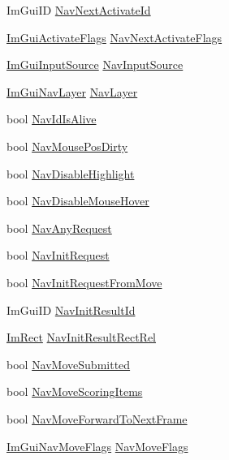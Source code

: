 \begin{DoxyCompactItemize}
Im\+Gui\+ID \hyperlink{structImGuiContext_abc1fa0d9750d44d4595905a0ce178ded}{Nav\+Next\+Activate\+Id}
\item 
\hyperlink{imgui__internal_8h_a69818e5784f8f39375ee58059c449ab2}{Im\+Gui\+Activate\+Flags} \hyperlink{structImGuiContext_a498c30d93a56d5cc173687ab25d86f85}{Nav\+Next\+Activate\+Flags}
\item 
\hyperlink{imgui__internal_8h_a8ee603a145a3a4f4ab5c93c8c8333b78}{Im\+Gui\+Input\+Source} \hyperlink{structImGuiContext_a3054bc5ed01af6c56159cd8de77e7b44}{Nav\+Input\+Source}
\item 
\hyperlink{imgui__internal_8h_afb412215b8327dc2c6af2c19fdca64c6}{Im\+Gui\+Nav\+Layer} \hyperlink{structImGuiContext_a19072bf282ae59f30d55478d74195d45}{Nav\+Layer}
\item 
bool \hyperlink{structImGuiContext_aabd1e23f5be55f6331281f2c2ea9e411}{Nav\+Id\+Is\+Alive}
\item 
bool \hyperlink{structImGuiContext_a45d87c28d8ea54ea82cb5d26c12c13db}{Nav\+Mouse\+Pos\+Dirty}
\item 
bool \hyperlink{structImGuiContext_a15bae5126d0c9f911ff5eacda9e6958f}{Nav\+Disable\+Highlight}
\item 
bool \hyperlink{structImGuiContext_aee7132fe5dfc3afdecf13c319da7dbf6}{Nav\+Disable\+Mouse\+Hover}
\item 
bool \hyperlink{structImGuiContext_a2bb94ad4b29cd6359f5e2a6d0f24e617}{Nav\+Any\+Request}
\item 
bool \hyperlink{structImGuiContext_ac1e37ea3392df255f52f8cc53bf8180a}{Nav\+Init\+Request}
\item 
bool \hyperlink{structImGuiContext_a92dbda9104ae60cea64926e9e7d98702}{Nav\+Init\+Request\+From\+Move}
\item 
Im\+Gui\+ID \hyperlink{structImGuiContext_a1a4e4062115647df8cfc566e595fe3e1}{Nav\+Init\+Result\+Id}
\item 
\hyperlink{structImRect}{Im\+Rect} \hyperlink{structImGuiContext_a4d59fe60fd93303628212a3d52f6c9e0}{Nav\+Init\+Result\+Rect\+Rel}
\item 
bool \hyperlink{structImGuiContext_a64c70fc7feea0cbc0aac843d2bf32b6e}{Nav\+Move\+Submitted}
\item 
bool \hyperlink{structImGuiContext_ae6b106c2ed61604aea063be16fc60408}{Nav\+Move\+Scoring\+Items}
\item 
bool \hyperlink{structImGuiContext_ad11b07c5a723bfe0aae33849719d41c8}{Nav\+Move\+Forward\+To\+Next\+Frame}
\item 
\hyperlink{imgui__internal_8h_aff7a453b89555bb074f2fe46a159ac25}{Im\+Gui\+Nav\+Move\+Flags} \hyperlink{structImGuiContext_ae43522d6c3e4615fdc2d78a43870b33b}{Nav\+Move\+Flags}

\end{DoxyCompactItemize}
